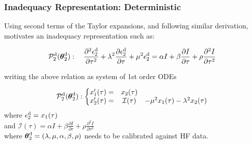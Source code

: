 \documentclass[10pt,xcolor=dvipsnames,compress]{beamer}
\begin{document}
\begin{frame}
\frametitle{Inadequacy Representation: Deterministic}
\vfill


Using second terms of the Taylor expansions, and following similar derivation, motivates an inadequacy representation such as:

\begin{problock}{}

\begin{equation*}
\mathcal{P}_2^{\rm d}(\boldsymbol{\theta}_2^{\rm d}) : \quad
\frac{\partial^2\epsilon_2^{\rm d}}{\partial\tau^2} + \lambda^2\frac{\partial\epsilon_2^{\rm d}}{\partial\tau} + \mu^2\epsilon_2
^{\rm d} =  \alpha I + \beta \frac{\partial I}{\partial\tau} + 
\rho \frac{\partial^2 I}{\partial\tau^2}
\end{equation*}

\end{problock}

writing the above relation as system of 1st order ODEs

\begin{problock}{}

\begin{equation*}
\mathcal{P}_2^{\rm d}(\boldsymbol{\theta}_2^{\rm d}) :\left\{\begin{matrix}
 x_1'(\tau) = & x_2(\tau) &\\ 
x_2'(\tau) = & \mathcal{I}(\tau) &-\mu^2 x_1(\tau) - \lambda^2 x_2(\tau)
\end{matrix}\right.
\end{equation*}
where $\epsilon_2^{\rm d} = x_1(\tau)$ \\
and
$\mathcal{I}(\tau) = \alpha I + \beta \frac{\partial I}{\partial \tau} + \rho \frac{\partial^2 I}{\partial \tau^2}$\\

where $
\boldsymbol{\theta}_2^{\rm d}=
(\lambda, \mu, \alpha, \beta, \rho)
$ needs to be calibrated against HF data.

\end{problock}


\vfill
\end{frame}
\end{document}
